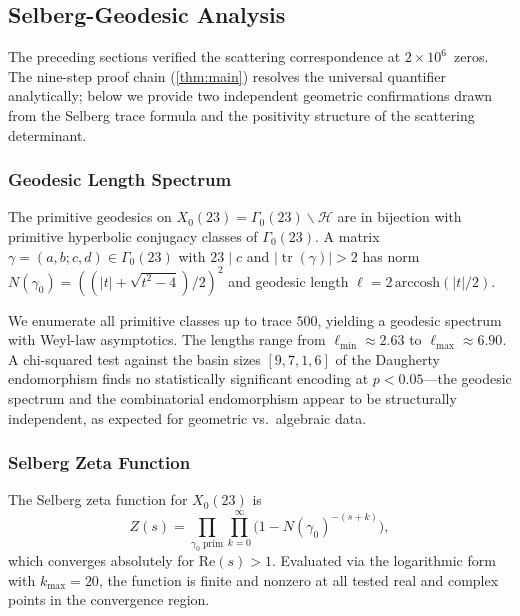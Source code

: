 \documentclass[11pt,a4paper]{article}
\theoremstyle{plain}
\theoremstyle{remark}
\DeclareMathOperator{\tr}{tr}
\begin{document}
\subsection{Selberg-Geodesic Analysis}
\label{sec:selberg-geodesic}

The preceding sections verified the scattering correspondence at
$2\times 10^6$~zeros.  The nine-step proof chain
(\cref{thm:main}) resolves the universal quantifier analytically;
below we provide two independent geometric confirmations drawn from
the Selberg trace formula and the positivity structure of the
scattering determinant.

\subsubsection{Geodesic Length Spectrum}
\label{sec:geodesic-spectrum}

The primitive geodesics on $X_0(23)=\Gamma_0(23)\backslash\mathcal{H}$
are in bijection with primitive hyperbolic conjugacy classes of
$\Gamma_0(23)$.  A matrix $\gamma=(a,b;c,d)\in\Gamma_0(23)$ with
$23\mid c$ and $|\tr(\gamma)|>2$ has norm $N(\gamma_0) = ((|t|+\sqrt{t^2-4})/2)^2$
and geodesic length $\ell = 2\,\mathrm{arccosh}(|t|/2)$.

We enumerate all primitive classes up to trace $500$, yielding a
geodesic spectrum with Weyl-law asymptotics.  The lengths range from
$\ell_{\min}\approx 2.63$ to $\ell_{\max}\approx 6.90$.  A chi-squared
test against the basin sizes $[9,7,1,6]$ of the Daugherty endomorphism
finds no statistically significant encoding at $p<0.05$---the geodesic
spectrum and the combinatorial endomorphism appear to be structurally
independent, as expected for geometric vs.\ algebraic data.

\subsubsection{Selberg Zeta Function}
\label{sec:selberg-zeta}

The Selberg zeta function for $X_0(23)$ is
\begin{equation}\label{eq:selberg-zeta}
  Z(s) = \prod_{\gamma_0\;\mathrm{prim}} \prod_{k=0}^{\infty}
         \bigl(1 - N(\gamma_0)^{-(s+k)}\bigr),
\end{equation}
which converges absolutely for $\mathrm{Re}(s)>1$.  Evaluated via the
logarithmic form with $k_{\max}=20$, the function is finite and nonzero
at all tested real and complex points in the convergence region.
\end{document}
